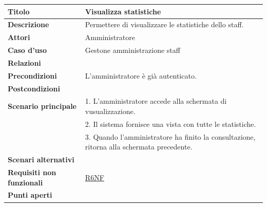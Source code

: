 \documentclass[a4paper]{article}
\begin{document}
\begin{center}
\begin{tabularx}{1\textwidth}{|l|X|}
    \hline
	\textbf{Titolo} & Visualizza statistiche \\
	\hline
	\textbf{Descrizione} & Permettere di visualizzare le statistiche dello staff. \\
	\hline
	\textbf{Attori} & Amministratore \\
	\hline
	\textbf{Caso d'uso} & Gestone amministrazione staff \\
	\hline
	\textbf{Relazioni} &  \\
	\hline
	\textbf{Precondizioni} & L'amministratore è già autenticato.  \\
	\hline
	\textbf{Postcondizioni} &  \\
	\hline
	\textbf{Scenario principale} & 1. L'amministratore accede alla schermata di vusualizzazione. \\
								 & 2. Il sistema fornisce una vista con tutte le statistiche. \\
								 & 3. Quando l'amministratore ha finito la consultazione, ritorna alla schermata precedente.\\
	\hline
	\textbf{Scenari alternativi} & \\
	\hline
	\textbf{Requisiti non funzionali} & \hyperlink{R6NF}{R6NF} \\
	\hline
	\textbf{Punti aperti} & \\
	\hline
\end{tabularx}
\end{center}

\end{document}
